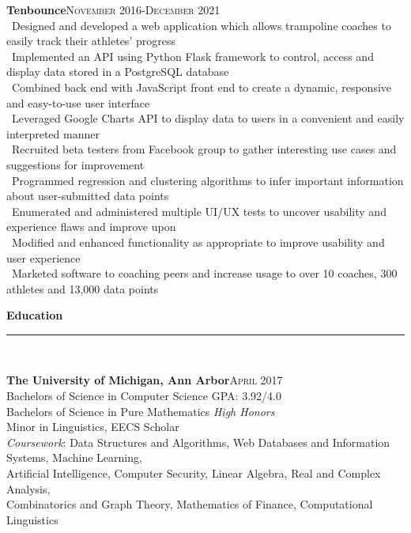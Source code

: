 \documentclass[a4paper,10pt]{article}
\newcommand{\horizontalline}{{\rule{533pt}{0.625pt}\\}}
\renewcommand{\section}[1]{{\noindent\textbf{\large #1}\\\horizontalline}}
\renewcommand{\subsection}[2]{{\noindent \textbf{#1}\hfill \textsc{#2}\\}}
\begin{document}
\subsection{Tenbounce}{November 2016-December 2021}
\textbullet\ Designed and developed a web application which allows trampoline coaches to easily track their athletes' progress\\
\textbullet\ Implemented an API using Python Flask framework to control, access and display data stored in a PostgreSQL database\\
\textbullet\ Combined back end with JavaScript front end to create a dynamic, responsive and easy-to-use user interface\\
\textbullet\ Leveraged Google Charts API to display data to users in a convenient and easily interpreted manner\\
\textbullet\ Recruited beta testers from Facebook group to gather interesting use cases and suggestions for improvement\\
\textbullet\ Programmed regression and clustering algorithms to infer important information about user-submitted data points\\
\textbullet\ Enumerated and administered multiple UI/UX tests to uncover usability and experience flaws and improve upon\\
\textbullet\ Modified and enhanced functionality as appropriate to improve usability and user experience\\
\textbullet\ Marketed software to coaching peers and increase usage to over 10 coaches, 300 athletes and 13,000 data points\\

\section{Education}
\subsection{The University of Michigan, Ann Arbor} {April 2017}
Bachelors of Science in Computer Science \hfill \normalsize \textsc{GPA}: 3.92/4.0\\
Bachelors of Science in Pure Mathematics \hfill \normalsize \textit{High Honors}\\
Minor in Linguistics, EECS Scholar\\
\textit{Coursework}: Data Structures and Algorithms, Web Databases and Information Systems, Machine Learning,\\
\hphantom{Coursework:::}Artificial Intelligence, Computer Security, Linear Algebra,
Real and Complex Analysis,\\
\hphantom{Coursework:::}Combinatorics and Graph Theory, Mathematics of Finance, Computational Linguistics\\
\end{document}
